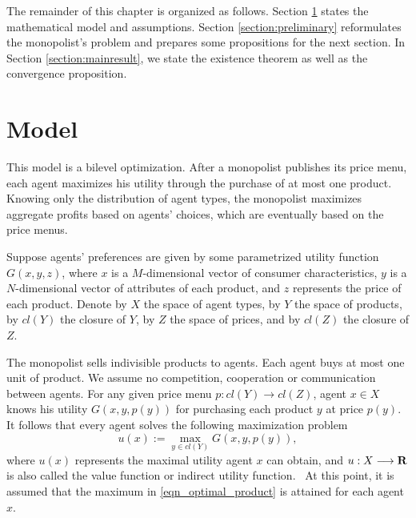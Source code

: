 The remainder of this chapter is organized as follows. Section \ref{section:model} states the mathematical model and assumptions. Section \ref{section:preliminary} reformulates the monopolist's problem and prepares some propositions for the next section. In Section \ref{section:mainresult}, we state the existence theorem as well as the convergence proposition. %


 


\section{Model}\label{section:model}



{This model is a bilevel optimization. After a monopolist publishes its price menu, each agent maximizes his utility through the purchase of at most one product. Knowing only the distribution of agent types, the monopolist maximizes aggregate profits based on agents' choices, which are eventually based on the price menus.}


Suppose agents' preferences are given by some parametrized utility function  $G(x, y, z)$, where $x$ is a $M$-dimensional vector of consumer characteristics, $y$ is a $N$-dimensional vector of attributes of each product, and $z$ represents the price of each product. Denote {by} $X$ the space of agent types, by $Y$ the space of products, by $cl(Y)$ the closure of $Y$, by $Z$ the space of prices, and by $cl(Z)$ the closure of $Z$.  \medskip

The monopolist sells indivisible products to agents. Each agent buys at most one unit of product. We assume no competition, cooperation or communication between agents. For any given price menu $p: cl(Y) \rightarrow cl(Z)$, agent $x \in X$ knows his utility $G(x,y,p(y))$ for purchasing each product $y$ at price $p(y)$. It follows that every agent solves the following maximization problem 
\begin{equation}\label{eqn_optimal_product}
	u(x):=\max_{y \in cl(Y)} G(x, y, p(y)),
\end{equation}
where $u(x)$ represents the maximal utility agent $x$ can obtain, and $u: X \longrightarrow {\mathbf R}$ is also called the value function or indirect utility function.%
~At this point, it is assumed that the maximum in \eqref{eqn_optimal_product} is attained for each agent $x$. \medskip

